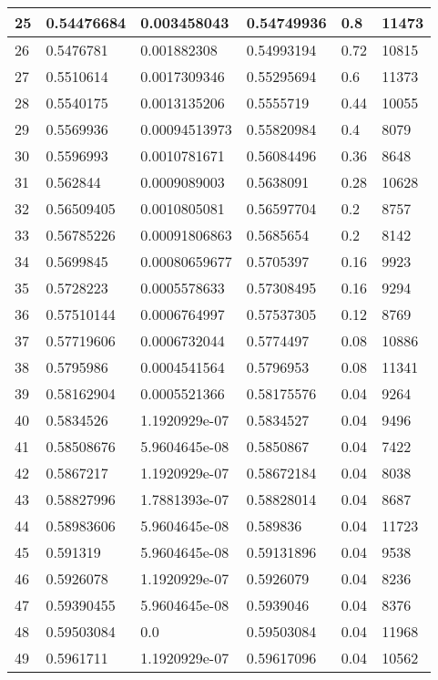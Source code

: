 \begin{longtable}{|l|l|l|l|l|l|}
25 & 0.54476684 & 0.003458043 & 0.54749936 & 0.8 & 11473 \\ \hline 
26 & 0.5476781 & 0.001882308 & 0.54993194 & 0.72 & 10815 \\ \hline 
27 & 0.5510614 & 0.0017309346 & 0.55295694 & 0.6 & 11373 \\ \hline 
28 & 0.5540175 & 0.0013135206 & 0.5555719 & 0.44 & 10055 \\ \hline 
29 & 0.5569936 & 0.00094513973 & 0.55820984 & 0.4 & 8079 \\ \hline 
30 & 0.5596993 & 0.0010781671 & 0.56084496 & 0.36 & 8648 \\ \hline 
31 & 0.562844 & 0.0009089003 & 0.5638091 & 0.28 & 10628 \\ \hline 
32 & 0.56509405 & 0.0010805081 & 0.56597704 & 0.2 & 8757 \\ \hline 
33 & 0.56785226 & 0.00091806863 & 0.5685654 & 0.2 & 8142 \\ \hline 
34 & 0.5699845 & 0.00080659677 & 0.5705397 & 0.16 & 9923 \\ \hline 
35 & 0.5728223 & 0.0005578633 & 0.57308495 & 0.16 & 9294 \\ \hline 
36 & 0.57510144 & 0.0006764997 & 0.57537305 & 0.12 & 8769 \\ \hline 
37 & 0.57719606 & 0.0006732044 & 0.5774497 & 0.08 & 10886 \\ \hline 
38 & 0.5795986 & 0.0004541564 & 0.5796953 & 0.08 & 11341 \\ \hline 
39 & 0.58162904 & 0.0005521366 & 0.58175576 & 0.04 & 9264 \\ \hline 
40 & 0.5834526 & 1.1920929e-07 & 0.5834527 & 0.04 & 9496 \\ \hline 
41 & 0.58508676 & 5.9604645e-08 & 0.5850867 & 0.04 & 7422 \\ \hline 
42 & 0.5867217 & 1.1920929e-07 & 0.58672184 & 0.04 & 8038 \\ \hline 
43 & 0.58827996 & 1.7881393e-07 & 0.58828014 & 0.04 & 8687 \\ \hline 
44 & 0.58983606 & 5.9604645e-08 & 0.589836 & 0.04 & 11723 \\ \hline 
45 & 0.591319 & 5.9604645e-08 & 0.59131896 & 0.04 & 9538 \\ \hline 
46 & 0.5926078 & 1.1920929e-07 & 0.5926079 & 0.04 & 8236 \\ \hline 
47 & 0.59390455 & 5.9604645e-08 & 0.5939046 & 0.04 & 8376 \\ \hline 
48 & 0.59503084 & 0.0 & 0.59503084 & 0.04 & 11968 \\ \hline 
49 & 0.5961711 & 1.1920929e-07 & 0.59617096 & 0.04 & 10562 \\ \hline 

\end{longtable}
